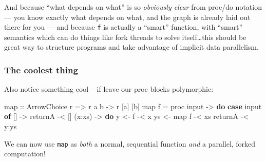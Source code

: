 \documentclass[]{article}
\newenvironment{Shaded}{}{}
\newcommand{\DataTypeTok}[1]{\textcolor[rgb]{0.56,0.13,0.00}{#1}}
\newcommand{\DecValTok}[1]{\textcolor[rgb]{0.25,0.63,0.44}{#1}}
\newcommand{\KeywordTok}[1]{\textcolor[rgb]{0.00,0.44,0.13}{\textbf{#1}}}
\newcommand{\NormalTok}[1]{#1}
\newcommand{\OperatorTok}[1]{\textcolor[rgb]{0.40,0.40,0.40}{#1}}
\newcommand{\OtherTok}[1]{\textcolor[rgb]{0.00,0.44,0.13}{#1}}
\begin{document}
And because ``what depends on what'' is so \emph{obviously clear} from proc/do
notation --- you know exactly what depends on what, and the graph is already
laid out there for you --- and because \texttt{f} is actually a ``smart''
function, with ``smart'' semantics which can do things like fork threads to
solve itself\ldots this should be great way to structure programs and take
advantage of implicit data parallelism.

\subsubsection{The coolest thing}\label{the-coolest-thing}

Also notice something cool -- if leave our proc blocks polymorphic:

\begin{Shaded}
\begin{Highlighting}[]
\OtherTok{map\textquotesingle{} ::} \DataTypeTok{ArrowChoice}\NormalTok{ r }\OtherTok{=\textgreater{}}\NormalTok{ r a b }\OtherTok{{-}\textgreater{}}\NormalTok{ r [a] [b]}
\NormalTok{map\textquotesingle{} f }\OtherTok{=}\NormalTok{ proc input }\OtherTok{{-}\textgreater{}} \KeywordTok{do}
    \KeywordTok{case}\NormalTok{ input }\KeywordTok{of}
\NormalTok{      []     }\OtherTok{{-}\textgreater{}}
\NormalTok{          returnA        }\OperatorTok{{-}\textless{}}\NormalTok{ []}
\NormalTok{      (x}\OperatorTok{:}\NormalTok{xs) }\OtherTok{{-}\textgreater{}} \KeywordTok{do}
\NormalTok{          y  }\OtherTok{\textless{}{-}}\NormalTok{ f        }\OperatorTok{{-}\textless{}}\NormalTok{ x}
\NormalTok{          ys }\OtherTok{\textless{}{-}}\NormalTok{ map\textquotesingle{} f   }\OperatorTok{{-}\textless{}}\NormalTok{ xs}
\NormalTok{          returnA        }\OperatorTok{{-}\textless{}}\NormalTok{ y}\OperatorTok{:}\NormalTok{ys}
\end{Highlighting}
\end{Shaded}

We can now use \texttt{map\textquotesingle{}} as \emph{both} a normal,
sequential function \emph{and} a parallel, forked computation!

\begin{Shaded}
\end{Shaded}
\end{document}
